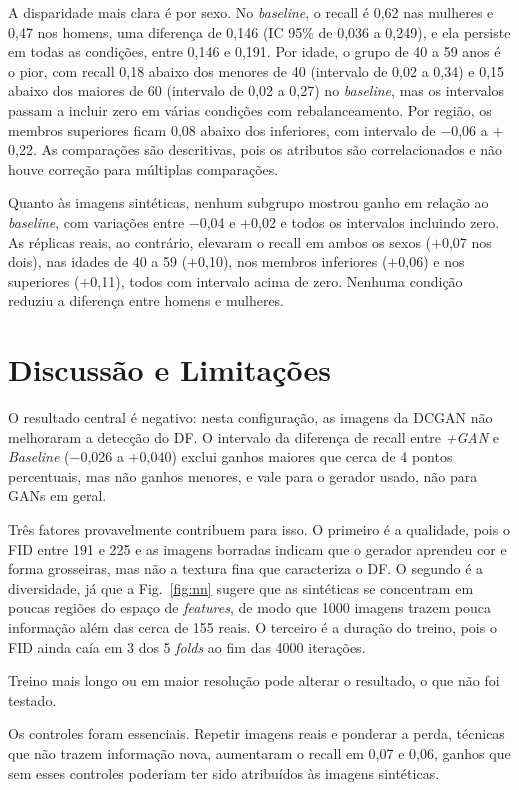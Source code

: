 \documentclass[conference]{IEEEtran}
\newcommand{\pl}{\ensuremath{+}}
\newcommand{\mn}{\ensuremath{-}}
\begin{document}
A disparidade mais clara é por sexo. No \textit{baseline}, o recall é 0,62 nas mulheres e 0,47 nos homens, uma diferença de 0,146 (IC 95\% de 0,036 a 0,249), e ela persiste em todas as condições, entre 0,146 e 0,191. Por idade, o grupo de 40 a 59 anos é o pior, com recall 0,18 abaixo dos menores de 40 (intervalo de 0,02 a 0,34) e 0,15 abaixo dos maiores de 60 (intervalo de 0,02 a 0,27) no \textit{baseline}, mas os intervalos passam a incluir zero em várias condições com rebalanceamento. Por região, os membros superiores ficam 0,08 abaixo dos inferiores, com intervalo de \mn0,06 a \pl0,22. As comparações são descritivas, pois os atributos são correlacionados e não houve correção para múltiplas comparações.

Quanto às imagens sintéticas, nenhum subgrupo mostrou ganho em relação ao \textit{baseline}, com variações entre \mn0,04 e \pl0,02 e todos os intervalos incluindo zero. As réplicas reais, ao contrário, elevaram o recall em ambos os sexos (\pl0,07 nos dois), nas idades de 40 a 59 (\pl0,10), nos membros inferiores (\pl0,06) e nos superiores (\pl0,11), todos com intervalo acima de zero. Nenhuma condição reduziu a diferença entre homens e mulheres.

\section{Discussão e Limitações}
\label{sec:disc}
O resultado central é negativo: nesta configuração, as imagens da DCGAN não melhoraram a detecção do DF. O intervalo da diferença de recall entre \textit{+GAN} e \textit{Baseline} (\mn0,026 a \pl0,040) exclui ganhos maiores que cerca de 4 pontos percentuais, mas não ganhos menores, e vale para o gerador usado, não para GANs em geral.

Três fatores provavelmente contribuem para isso. O primeiro é a qualidade, pois o FID entre 191 e 225 e as imagens borradas indicam que o gerador aprendeu cor e forma grosseiras, mas não a textura fina que caracteriza o DF. O segundo é a diversidade, já que a Fig.~\ref{fig:nn} sugere que as sintéticas se concentram em poucas regiões do espaço de \textit{features}, de modo que 1000 imagens trazem pouca informação além das cerca de 155 reais. O terceiro é a duração do treino, pois o FID ainda caía em 3 dos 5 \textit{folds} ao fim das 4000 iterações.

Treino mais longo ou em maior resolução pode alterar o resultado, o que não foi testado.

Os controles foram essenciais. Repetir imagens reais e ponderar a perda, técnicas que não trazem informação nova, aumentaram o recall em 0,07 e 0,06, ganhos que sem esses controles poderiam ter sido atribuídos às imagens sintéticas.
\end{document}

